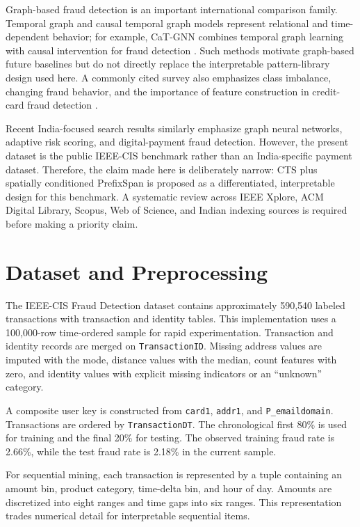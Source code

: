 \documentclass[conference]{IEEEtran}
\begin{document}
Graph-based fraud detection is an important international comparison family. Temporal graph and causal temporal graph models represent relational and time-dependent behavior; for example, CaT-GNN combines temporal graph learning with causal intervention for fraud detection \cite{duan2024catgnn}. Such methods motivate graph-based future baselines but do not directly replace the interpretable pattern-library design used here. A commonly cited survey also emphasizes class imbalance, changing fraud behavior, and the importance of feature construction in credit-card fraud detection \cite{abdallah2016survey}.

Recent India-focused search results similarly emphasize graph neural networks, adaptive risk scoring, and digital-payment fraud detection. However, the present dataset is the public IEEE-CIS benchmark rather than an India-specific payment dataset. Therefore, the claim made here is deliberately narrow: CTS plus spatially conditioned PrefixSpan is proposed as a differentiated, interpretable design for this benchmark. A systematic review across IEEE Xplore, ACM Digital Library, Scopus, Web of Science, and Indian indexing sources is required before making a priority claim.

\section{Dataset and Preprocessing}
The IEEE-CIS Fraud Detection dataset contains approximately 590,540 labeled transactions with transaction and identity tables. This implementation uses a 100,000-row time-ordered sample for rapid experimentation. Transaction and identity records are merged on \texttt{TransactionID}. Missing address values are imputed with the mode, distance values with the median, count features with zero, and identity values with explicit missing indicators or an ``unknown'' category.

A composite user key is constructed from \texttt{card1}, \texttt{addr1}, and \texttt{P\_emaildomain}. Transactions are ordered by \texttt{TransactionDT}. The chronological first 80\% is used for training and the final 20\% for testing. The observed training fraud rate is 2.66\%, while the test fraud rate is 2.18\% in the current sample.

For sequential mining, each transaction is represented by a tuple containing an amount bin, product category, time-delta bin, and hour of day. Amounts are discretized into eight ranges and time gaps into six ranges. This representation trades numerical detail for interpretable sequential items.
\end{document}
